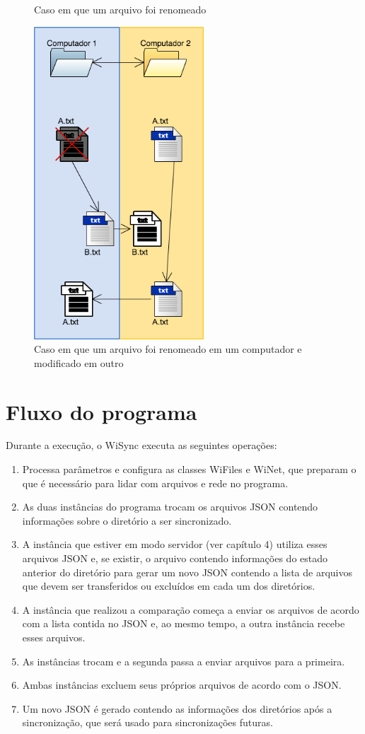 \documentclass[12pt,a4paper]{ufpr}
\begin{document}
\begin{itemize}
\begin{figure}[h]
    \caption{Caso em que um arquivo foi renomeado}
    \label{d}
  \end{figure}
  \begin{figure}[h]
    \centering
    \includegraphics[width=180pt]{img/e.png}
    \caption{Caso em que um arquivo foi renomeado em um computador e modificado em outro}
    \label{e}
  \end{figure}
\end{itemize}

\section{Fluxo do programa}
Durante a execução, o WiSync executa as seguintes operações:
\begin{enumerate}
  \item Processa parâmetros e configura as classes WiFiles e WiNet, que preparam o que é necessário para lidar com arquivos e rede no programa.
    \item As duas instâncias do programa trocam os arquivos JSON contendo informações sobre o diretório a ser sincronizado.
    \item A instância que estiver em modo servidor (ver capítulo 4) utiliza esses arquivos JSON e, se existir, o arquivo contendo informações do estado anterior do diretório para gerar um novo JSON contendo a lista de arquivos que devem ser transferidos ou excluídos em cada um dos diretórios.
    \item A instância que realizou a comparação começa a enviar os arquivos de acordo com a lista contida no JSON e, ao mesmo tempo, a outra instância recebe esses arquivos.
    \item As instâncias trocam e a segunda passa a enviar arquivos para a primeira.
    \item Ambas instâncias excluem seus próprios arquivos de acordo com o JSON.
    \item Um novo JSON é gerado contendo as informações dos diretórios após a sincronização, que será usado para sincronizações futuras.
\end{enumerate}
\end{document}
